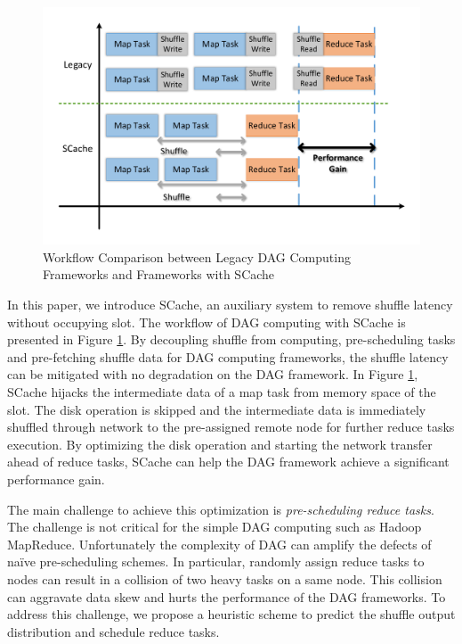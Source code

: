 \begin{figure}
	\centering
	\includegraphics[width=\linewidth]{fig/workflow}
	\caption{Workflow Comparison between Legacy DAG Computing Frameworks and Frameworks with SCache}
	\label{fig:workflow}
\end{figure}

In this paper, we introduce SCache, an auxiliary system to remove shuffle latency without occupying slot. The workflow of DAG computing with SCache is presented in Figure \ref{fig:workflow}. By decoupling shuffle from computing, pre-scheduling tasks and pre-fetching shuffle data for DAG computing frameworks, the shuffle latency can be mitigated with no degradation on the DAG framework. In Figure \ref{fig:workflow}, SCache hijacks the intermediate data of a map task from memory space of the slot. The disk operation is skipped and the intermediate data is immediately shuffled through network to the pre-assigned remote node for further reduce tasks execution. By optimizing the disk operation and starting the network transfer ahead of reduce tasks, SCache can help the DAG framework achieve a significant performance gain.

The main challenge to achieve this optimization is \textit{pre-scheduling reduce tasks}. The challenge is not critical for the simple DAG computing such as Hadoop MapReduce\cite{mapreduce}. Unfortunately the complexity of DAG can amplify the defects of na\"{i}ve pre-scheduling schemes. In particular, randomly assign reduce tasks to nodes can result in a collision of two heavy tasks on a same node. This collision can aggravate data skew and hurts the performance of the DAG frameworks. To address this challenge, we propose a heuristic scheme to predict the shuffle output distribution and schedule reduce tasks.

